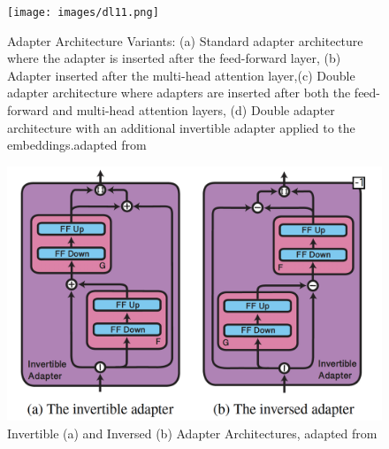 \documentclass[conference]{IEEEtran}
\begin{document}
\begin{figure}[htbp]
    \centering
    \texttt{[image: images/dl11.png]}
    \caption{Adapter Architecture Variants: (a) Standard adapter architecture where the adapter is inserted after the feed-forward layer, (b) Adapter inserted after the multi-head attention layer,(c) Double adapter architecture where adapters are inserted after both the feed-forward and multi-head attention layers, (d) Double adapter architecture with an additional invertible adapter applied to the embeddings.adapted from \cite{b7}}
\end{figure}


\begin{figure}[htbp]
    \centering
    \includegraphics[width=1\linewidth]{images/invertible_adapter.png}
    \caption{Invertible (a) and Inversed (b) Adapter Architectures, adapted from \cite{b13}}
\end{figure}
\end{document}
